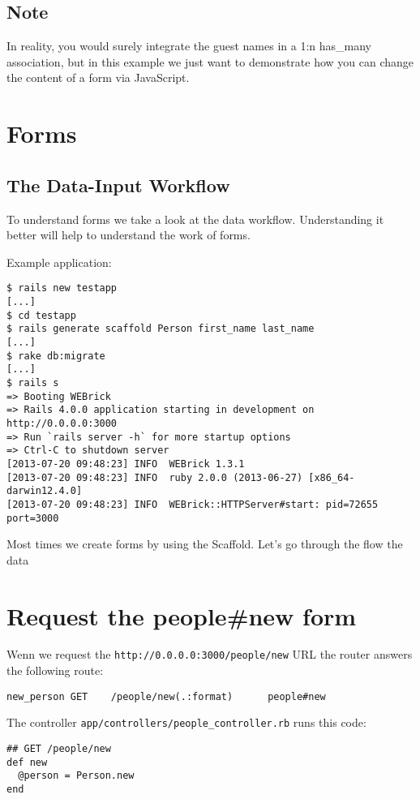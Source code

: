 \documentclass[a4paper]{book}
\newcommand{\chap}[1]{\newpage\thispagestyle{empty}\chapter{#1}\label{chap:\thechapter}}
\begin{document}
\section{Note}\label{note-52}

In reality, you would surely integrate the guest names in a 1:n has\_many association, but in this example we just want to demonstrate how you can change the content of a form via JavaScript.

\chap{Forms}\label{forms}

\section{The Data-Input Workflow}\label{the-data-input-workflow}

To understand forms we take a look at the data workflow. Understanding it better will help to understand the work of forms.

Example application:

\begin{shaded}\begin{verbatim}
$ rails new testapp
[...]
$ cd testapp
$ rails generate scaffold Person first_name last_name
[...]
$ rake db:migrate
[...]
$ rails s
=> Booting WEBrick
=> Rails 4.0.0 application starting in development on http://0.0.0.0:3000
=> Run `rails server -h` for more startup options
=> Ctrl-C to shutdown server
[2013-07-20 09:48:23] INFO  WEBrick 1.3.1
[2013-07-20 09:48:23] INFO  ruby 2.0.0 (2013-06-27) [x86_64-darwin12.4.0]
[2013-07-20 09:48:23] INFO  WEBrick::HTTPServer#start: pid=72655 port=3000
\end{verbatim}\end{shaded}

Most times we create forms by using the Scaffold. Let's go through the flow the data

\chap{Request the people\#new form}\label{request-the-peoplenew-form}

Wenn we request the \texttt{http://0.0.0.0:3000/people/new} URL the router answers the following route:

\begin{shaded}\begin{verbatim}
new_person GET    /people/new(.:format)      people#new
\end{verbatim}\end{shaded}

The controller \texttt{app/controllers/people\_controller.rb} runs this code:

\begin{shaded}\begin{verbatim}
## GET /people/new
def new
  @person = Person.new
end
\end{verbatim}\end{shaded}
\end{document}
